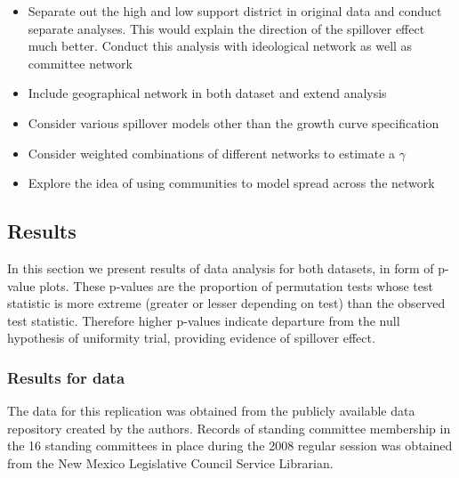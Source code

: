 \documentclass[12pt]{article}
\begin{document}
\begin{itemize}
\item Separate out the high and low support district in original \citet{butler2011can} data and conduct separate analyses. This would explain the direction of the spillover effect much better. Conduct this analysis with ideological network as well as committee network

\item Include geographical network in both dataset and extend analysis

\item Consider various spillover models other than the growth curve specification

\item Consider weighted combinations of different networks to estimate a $\gamma$

\item Explore the idea of using communities to model spread across the network

\end{itemize}


\subsection{Results}
In this section we present results of data analysis for both datasets, in form of p-value plots. These p-values are the proportion of permutation tests whose test statistic is more extreme (greater or lesser depending on test) than the observed test statistic. Therefore higher p-values indicate departure from the null hypothesis of uniformity trial, providing evidence of spillover effect.

\subsubsection{Results for \citet{butler2011can} data}

The data for this replication was obtained from the publicly available data repository created by the authors. Records of standing committee membership in the 16 standing committees in place during the 2008 regular session was obtained from the New Mexico Legislative Council Service Librarian.
\end{document}
